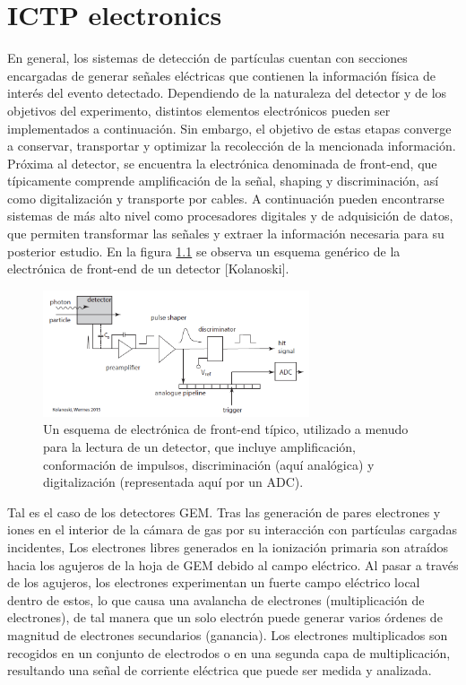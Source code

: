 \documentclass[]{book}
\begin{document}
\chapter{ICTP electronics}

\noindent En general, los sistemas de detección de partículas cuentan con secciones encargadas de generar señales eléctricas que contienen la información física de interés del evento detectado. Dependiendo de la naturaleza del detector y de los objetivos del experimento, distintos elementos electrónicos pueden ser implementados a continuación. Sin embargo, el objetivo de estas etapas converge a conservar, transportar y optimizar la recolección de la mencionada información. Próxima al detector, se encuentra la electrónica denominada de front-end, que típicamente comprende amplificación de la señal, shaping y discriminación, así como digitalización y transporte por cables. A continuación pueden encontrarse sistemas de más alto nivel como procesadores digitales y de adquisición de datos, que permiten transformar las señales y extraer la información necesaria para su posterior estudio. En la figura \ref{fig:frontend} se observa un esquema genérico de la electrónica de front-end de un detector [Kolanoski].

\begin{figure}
    \centering
    \includegraphics[width=0.7\textwidth]{typical_readout_electronics.PNG}
    \caption{Un esquema de electrónica de front-end típico, utilizado a menudo para la lectura de un
    detector, que incluye amplificación, conformación de impulsos, discriminación
    (aquí analógica) y digitalización (representada aquí por un ADC).}
    \label{fig:frontend}

\end{figure}
    
    


\noindent Tal es el caso de los detectores GEM. Tras las generación de pares electrones y iones en el interior de la cámara de gas por su interacción con partículas cargadas incidentes, Los electrones libres generados en la ionización primaria son atraídos hacia los agujeros de la hoja de GEM debido al campo eléctrico. Al pasar a través de los agujeros, los electrones experimentan un fuerte campo eléctrico local dentro de estos, lo que causa una avalancha de electrones (multiplicación de electrones), de tal manera que un solo electrón puede generar varios órdenes de magnitud de electrones secundarios (ganancia). Los electrones multiplicados son recogidos en un conjunto de electrodos o en una segunda capa de multiplicación, resultando una señal de corriente eléctrica que puede ser medida y analizada.
\end{document}
